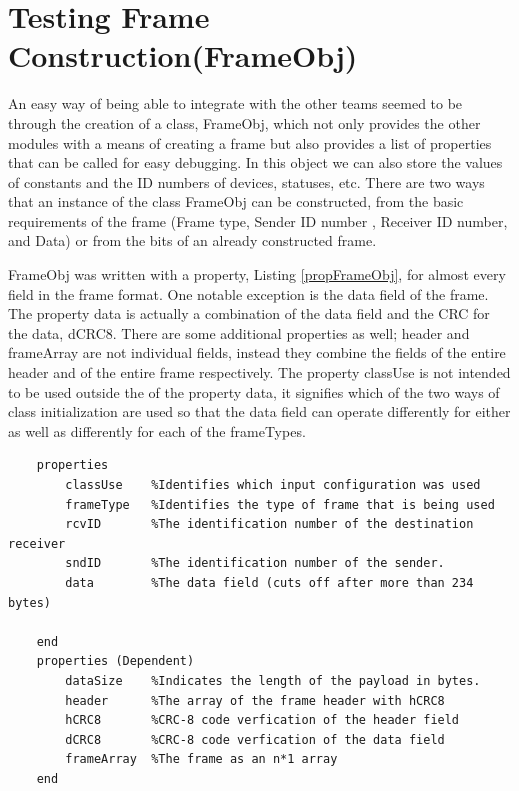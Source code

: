\section{Testing Frame Construction(FrameObj)}
An easy way of being able to integrate with the other teams seemed to be through the creation of a class, FrameObj, which not only provides the other modules with a means of creating a frame but also provides a list of properties that can be called for easy debugging. In this object we can also store the values of constants and the ID numbers of devices, statuses, etc.  There are two ways that an instance of the class FrameObj can be constructed,  from the basic requirements of the frame (Frame type, Sender ID number , Receiver ID number, and Data) or from the bits of an already constructed frame.

FrameObj was written with a property, Listing \ref{propFrameObj}, for almost every field in the frame format. One notable exception is the data field of the frame. The property data is actually a combination of the data field and the CRC for the data, dCRC8. There are some additional properties as well; header and frameArray are not individual fields, instead they combine the fields of the entire header and of the entire frame respectively. The property classUse is not intended to be used outside the of the property data, it signifies which of the two ways of class initialization are used so that the data field can operate differently for either as well as differently for each of the frameTypes.
\begin{lstlisting} 
    properties
        classUse    %Identifies which input configuration was used
        frameType   %Identifies the type of frame that is being used
        rcvID       %The identification number of the destination receiver
        sndID       %The identification number of the sender.
        data        %The data field (cuts off after more than 234 bytes)
        
    end
    properties (Dependent)
        dataSize    %Indicates the length of the payload in bytes.
        header      %The array of the frame header with hCRC8
        hCRC8       %CRC-8 code verfication of the header field
        dCRC8       %CRC-8 code verfication of the data field
        frameArray  %The frame as an n*1 array
    end
\end{lstlisting}

